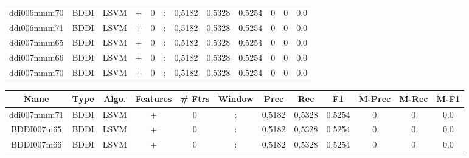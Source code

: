 \documentclass[a4paper]{article}
\begin{document}
\begin{landscape}
\begin{center}
\begin{tabular}{ |c|c|c|c|c|c|c|c|c|c|c|c|}
 	
 		
 		\small{ ddi006mmm70 } & BDDI & LSVM & +  &  0 &  :  &  0,5182 & 0,5328 & 0.5254  &  0 & 0 & 0.0 \\
 		

 	
 
 	
 		
 		\small{ ddi006mmm71 } & BDDI & LSVM & +  &  0 &  :  &  0,5182 & 0,5328 & 0.5254  &  0 & 0 & 0.0 \\
 		

 	
 
 	
 		
 		\small{ ddi007mmm65 } & BDDI & LSVM & +  &  0 &  :  &  0,5182 & 0,5328 & 0.5254  &  0 & 0 & 0.0 \\
 		

 	
 
 	
 		
 		\small{ ddi007mmm66 } & BDDI & LSVM & +  &  0 &  :  &  0,5182 & 0,5328 & 0.5254  &  0 & 0 & 0.0 \\
 		

 	
 
 	
 		
 		\small{ ddi007mmm70 } & BDDI & LSVM & +  &  0 &  :  &  0,5182 & 0,5328 & 0.5254  &  0 & 0 & 0.0 \\
 		
 \hline
\end{tabular}
\end{center}




\begin{center}
\begin{tabular}{ |c|c|c|c|c|c|c|c|c|c|c|c|} 
 \hline
 	Name & Type & Algo. & Features & \# Ftrs & Window & Prec & Rec & F1 & M-Prec & M-Rec & M-F1\\
 \hline

 		

 	
 
 	
 		
 		\small{ ddi007mmm71 } & BDDI & LSVM & +  &  0 &  :  &  0,5182 & 0,5328 & 0.5254  &  0 & 0 & 0.0 \\
 		

 	
 
 	
 		
 		\small{ BDDI007m65 } & BDDI & LSVM & +  &  0 &  :  &  0,5182 & 0,5328 & 0.5254  &  0 & 0 & 0.0 \\
 		

 	
 
 	
 		
 		\small{ BDDI007m66 } & BDDI & LSVM & +  &  0 &  :  &  0,5182 & 0,5328 & 0.5254  &  0 & 0 & 0.0 \\
 		


\end{tabular}
\end{center}
\end{landscape}
\end{document}

